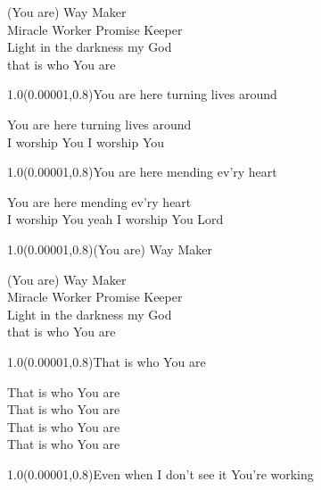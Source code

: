 \documentclass[aspectratio=169]{beamer}
\begin{document}
\begin{frame}
\centering
\color{white}
\huge{(You are) Way Maker} \\
\huge{Miracle Worker Promise Keeper} \\
\huge{Light in the darkness my God} \\
\huge{that is who You are} \\

\begin{textblock}{1.0}(0.00001,0.8)\color{gray}\normalsize{You are here turning lives around}\end{textblock}
\end{frame}

\begin{frame}
\centering
\color{white}
\huge{You are here turning lives around} \\
\huge{I worship You I worship You} \\

\begin{textblock}{1.0}(0.00001,0.8)\color{gray}\normalsize{You are here mending ev'ry heart}\end{textblock}
\end{frame}

\begin{frame}
\centering
\color{white}
\huge{You are here mending ev'ry heart} \\
\huge{I worship You yeah I worship You Lord} \\

\begin{textblock}{1.0}(0.00001,0.8)\color{gray}\normalsize{(You are) Way Maker}\end{textblock}
\end{frame}

\begin{frame}
\centering
\color{white}
\huge{(You are) Way Maker} \\
\huge{Miracle Worker Promise Keeper} \\
\huge{Light in the darkness my God} \\
\huge{that is who You are} \\

\begin{textblock}{1.0}(0.00001,0.8)\color{gray}\normalsize{That is who You are}\end{textblock}
\end{frame}

\begin{frame}
\centering
\color{white}
\huge{That is who You are} \\
\huge{That is who You are} \\
\huge{That is who You are} \\
\huge{That is who You are} \\

\begin{textblock}{1.0}(0.00001,0.8)\color{gray}\normalsize{Even when I don't see it You're working}\end{textblock}
\end{frame}
\end{document}
